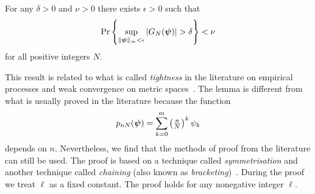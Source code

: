 \documentclass[journal]{IEEEtran}
\begin{document}
\begin{lemma}\label{lem:unifprobG}
For any $\delta >0$ and $\nu > 0$ there exists $\epsilon > 0$ such that
\[
\prob\left\{ \sup_{\|\psibf\|_{\infty} < \epsilon} \abs{ G_N(\psibf) } > \delta   \right\} < \nu %
\]
for all positive integers $N$.
\end{lemma}

This result is related to what is called \emph{tightness} in the literature on empirical processes and weak convergence on metric spaces~\cite{Billingsley1999_convergence_of_probability_measures,Dudley_unif_central_lim_th_1999,Shorak_emp_proc_stat_2009}.  The lemma is different from what is usually proved in the literature because the function 
\[
p_{nN}(\boldsymbol{\psi}) = \sum_{k=0}^m\left( \tfrac{n}{N}\right)^k\psi_k
\]
depends on $n$.  Nevertheless, we find that the methods of proof from the literature can still be used. The proof is based on a technique called \emph{symmetrisation} and another technique called \emph{chaining} (also known as \emph{bracketing})~\cite{Pollard_asymp_empi_proc_1989}.  During the proof we treat $\ell$ as a fixed constant.  The proof holds for any nonegative integer $\ell$.
\end{document}
